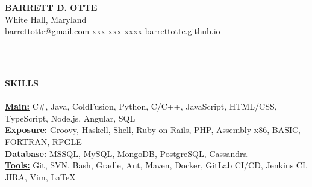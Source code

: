 \documentclass{article}
\newcommand{\lineunder}{
	\vspace*{-4pt}\\ 
	\hspace*{-18pt}\hrulefill \\
}
\newcommand{\header}[1]{
	{\hspace*{-15pt}\vspace*{6pt}\textsc{#1}}\vspace*{-6pt}\lineunder
}
\newcommand{\contact}[5]{
	\vspace*{-8pt}
	\begin{center}
		{\Large \textbf \scshape {#1}}\\
		\normalsize #2\\
		\normalsize #3 \hspace*{20pt} 
		\normalsize #4 \hspace*{20pt}
		\normalsize #5
		\lineunder
	\end{center}
	\vspace*{-8pt}
}
\newcommand{\resumeheader}[1]{
	\vspace*{5pt}
	\header{\textbf{#1}}
}
\begin{document}
	\normalsize
	\smallskip
	\vspace*{-44pt}

	\contact
		{\bfseries BARRETT D. OTTE}
		{White Hall, Maryland}
		{barrettotte@gmail.com}
		{xxx-xxx-xxxx}
		{barrettotte.github.io}
	
	\resumeheader{SKILLS}
		\textbf{\underline{Main:}} 
			C\#, Java, ColdFusion, Python, C/C++, JavaScript, HTML/CSS, TypeScript, Node.js, Angular, SQL \\ \vspace*{4pt}
		\textbf{\underline{Exposure:}} 
			Groovy, Haskell, Shell, Ruby on Rails, PHP, Assembly x86, BASIC, FORTRAN, RPGLE \\ \vspace*{4pt}
		\textbf{\underline{Database:}} 
			MSSQL, MySQL, MongoDB, PostgreSQL, Cassandra \\ \vspace*{4pt}
		\textbf{\underline{Tools:}} 
			Git, SVN, Bash, Gradle, Ant, Maven, Docker, GitLab CI/CD, Jenkins CI, JIRA, Vim, LaTeX \\ \vspace*{4pt}
		
\end{document}
